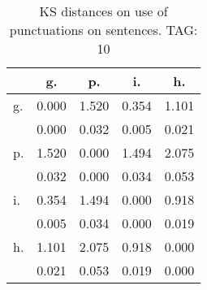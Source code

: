 \begin{table}[h!]
\begin{center}
\begin{tabular}{| l | c | c | c | c |}\hline
 & g. & p. & i. & h. \\\hline
g. & 0.000  & 1.520  & 0.354  & 1.101 \\\hline
 & 0.000  & 0.032  & 0.005  & 0.021 \\\hline
p. & 1.520  & 0.000  & 1.494  & 2.075 \\\hline
 & 0.032  & 0.000  & 0.034  & 0.053 \\\hline
i. & 0.354  & 1.494  & 0.000  & 0.918 \\\hline
 & 0.005  & 0.034  & 0.000  & 0.019 \\\hline
h. & 1.101  & 2.075  & 0.918  & 0.000 \\\hline
 & 0.021  & 0.053  & 0.019  & 0.000 \\\hline
\end{tabular}
\caption{KS distances on use of punctuations on sentences. TAG: 10}
\end{center}
\end{table}